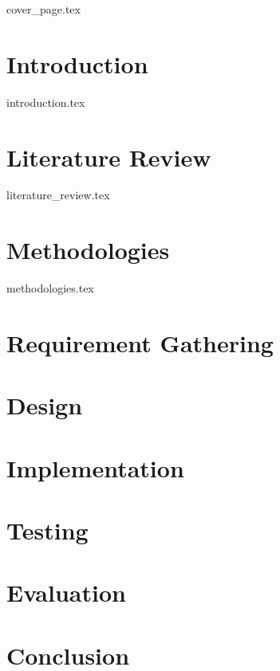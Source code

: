 \documentclass[a4paper, 12pt, oneside]{book}
\begin{document}
\frontmatter
{cover_page.tex}


\tableofcontents

{\let\clearpage\relax
\listoffigures}
{\let\clearpage\relax
\listoftables}
{\let\clearpage\relax
\printglossary[type=\acronymtype
]}

\mainmatter

\onehalfspacing %

\chapter{Introduction}
{introduction.tex}

\chapter{Literature Review}
{literature_review.tex}

\chapter{Methodologies}
{methodologies.tex}

\chapter{Requirement Gathering}

\chapter{Design}

\chapter{Implementation}

\chapter{Testing}

\chapter{Evaluation}

\chapter{Conclusion}

\backmatter
\setlength{} %
\printbibliography[heading=bibintoc, title = {References}]


\end{document}
